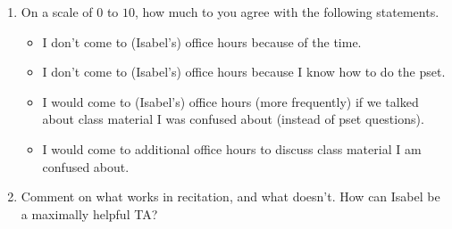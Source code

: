 \documentclass[12pt]{amsart}
\begin{document}
\begin{enumerate}
\vspace{10pt}

\item On a scale of $0$ to $10$, how much to you agree with the following statements.
\vspace{10pt}
\begin{itemize}
\item[\underline{\phantom{aaaaa}}] I don't come to (Isabel's) office hours because of the time.
\vspace{5pt}
\item[\underline{\phantom{aaaaa}}] I don't come to (Isabel's) office hours because I know how to do the pset.
\vspace{5pt}
\item[\underline{\phantom{aaaaa}}] I would come to (Isabel's) office hours (more frequently) if we talked about class material I was confused about (instead of pset questions).
\vspace{5pt}
\item[\underline{\phantom{aaaaa}}] I would come to additional office hours to discuss class material I am confused about.
\end{itemize}
\vspace{10pt}
\item Comment on what works in recitation, and what doesn't.  How can Isabel be a maximally helpful TA?


\end{enumerate}
\end{document}
